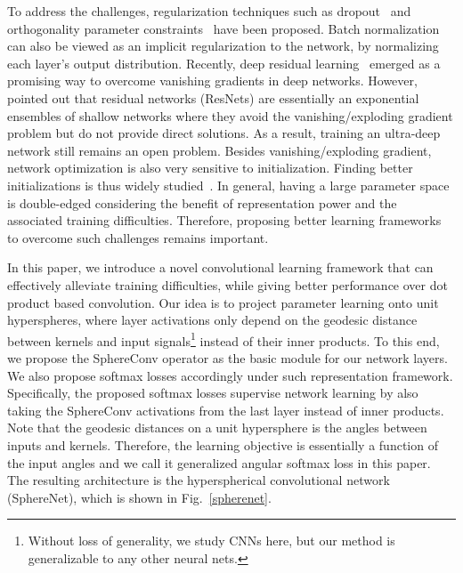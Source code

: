 To address the challenges, regularization techniques such as dropout~\cite{krizhevsky2012imagenet} and orthogonality parameter constraints~\cite{xie2017all} have been proposed. Batch normalization~\cite{ioffe2015batch} can also be viewed as an implicit regularization to the network, by normalizing each layer's output distribution. Recently, deep residual learning~\cite{he2015deep} emerged as a promising way to overcome vanishing gradients in deep networks. However,~\cite{veit2016residual} pointed out that residual networks (ResNets) are essentially an exponential ensembles of shallow networks where they avoid the vanishing/exploding gradient problem but do not provide direct solutions. As a result, training an ultra-deep network still remains an open problem. Besides vanishing/exploding gradient, network optimization is also very sensitive to initialization. Finding better initializations is thus widely studied~\cite{he2015delving,mishkin2015all,glorot2010understanding}. In general, having a large parameter space is double-edged considering the benefit of representation power and the associated training difficulties. Therefore, proposing better learning frameworks to overcome such challenges remains important.
\par
In this paper, we introduce a novel convolutional learning framework that can effectively alleviate training difficulties, while giving better performance over dot product based convolution. Our idea is to project parameter learning onto unit hyperspheres, where layer activations only depend on the geodesic distance between kernels and input signals\footnote{Without loss of generality, we study CNNs here, but our method is generalizable to any other neural nets.} instead of their inner products. To this end, we propose the SphereConv operator as the basic module for our network layers. We also propose softmax losses accordingly under such representation framework. Specifically, the proposed softmax losses supervise network learning by also taking the SphereConv activations from the last layer instead of inner products. Note that the geodesic distances on a unit hypersphere is the angles between inputs and kernels. Therefore, the learning objective is essentially a function of the input angles and we call it generalized angular softmax loss in this paper. The resulting architecture is the hyperspherical convolutional network (SphereNet), which is shown in Fig.~\ref{spherenet}.
\par

